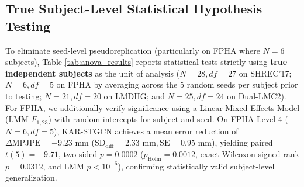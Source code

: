 \documentclass[10pt,twocolumn]{article}
\begin{document}
\subsection{True Subject-Level Statistical Hypothesis Testing}
To eliminate seed-level pseudoreplication (particularly on FPHA where $N=6$ subjects), Table \ref{tab:anova_results} reports statistical tests strictly using \textbf{true independent subjects} as the unit of analysis ($N=28, df=27$ on SHREC'17; $N=6, df=5$ on FPHA by averaging across the 5 random seeds per subject prior to testing; $N=21, df=20$ on LMDHG; and $N=25, df=24$ on Dual-LMC2). For FPHA, we additionally verify significance using a Linear Mixed-Effects Model ($\text{LMM } F_{1,23}$) with random intercepts for subject and seed. On FPHA Level 4 ($N=6, df=5$), KAR-STGCN achieves a mean error reduction of $\Delta\text{MPJPE} = -9.23\text{ mm}$ ($\text{SD}_{\text{diff}}=2.33\text{ mm}, \text{SE}=0.95\text{ mm}$), yielding paired $t(5) = -9.71$, two-sided $p = 0.0002$ ($p_{\text{Holm}} = 0.0012$, exact Wilcoxon signed-rank $p = 0.0312$, and LMM $p < 10^{-6}$), confirming statistically valid subject-level generalization.
\end{document}
